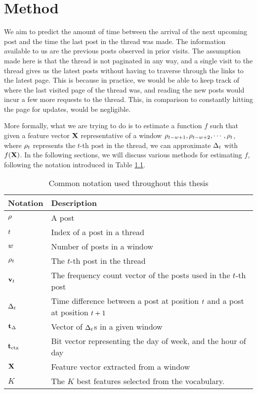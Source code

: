 \chapter{Method}

We aim to predict the amount of time between the arrival of the next upcoming 
post and the time the last post in the thread was made. The information 
available to us are the previous posts observed in prior visits.  The assumption 
made here is that the thread is not paginated in any way, and a single visit to 
the thread gives us the latest posts without having to traverse through the 
links to the latest page. This is because in practice, we would be able to keep 
track of where the last visited page of the thread was, and reading the new 
posts would incur a few more requests to the thread. This, in comparison to 
constantly hitting the page for updates, would be negligible.

More formally, what we are trying to do is to estimate a function $f$ such that 
given a feature vector $\mathbf{X}$ representative of a window $\rho_{t - w + 
1},\rho_{t - w + 2},\cdots ,\rho_t$, where $\rho_t$ represents the $t$-th 
post in the thread, we can approximate $\Delta_t$ with $f(\mathbf{X})$.  In the following 
sections, we will discuss various methods for estimating $f$, following the notation introduced in Table \ref{table:notations}.

\begin{table}
	\begin{center}
	\begin{tabular}{l l}
	\hline
Notation	&	Description\\
	\hline
$\rho$		&	A post\\
$t$		&	Index of a post in a thread\\
$w$		&	Number of posts in a window  \\
$\rho_t$	&	The $t$-th post in the thread\\
$\mathbf{v}_t$	&	The frequency count vector of the posts used in the $t$-th 
	post\\
$\Delta_t$		&	Time difference between a post at position $t$ and a post at 
	position $t+1$ \\
$\mathbf{t}_\Delta$	&	Vector of $\Delta_t$s in a given window\\
$\mathbf{t}_\text{ctx}$	&	Bit vector representing the day of week, and the hour of day\\
$\mathbf{X}$		&	Feature vector extracted from a window\\
$K$			&	The $K$ best features selected from the vocabulary.\\
	\hline
	\end{tabular}
\end{center}
\caption{Common notation used throughout this thesis} \label{table:notations}
\end{table}

